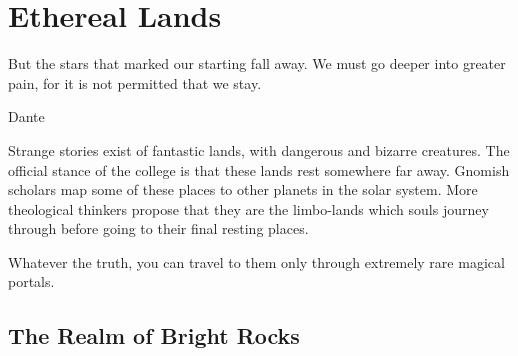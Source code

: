 \chapter{Ethereal Lands}

\epigraph{But the stars that marked our starting fall away.
We must go deeper into greater pain,
for it is not permitted that we stay.}{Dante}

Strange stories exist of fantastic lands, with dangerous and bizarre creatures.  The official stance of the \gls{college} is that these lands rest somewhere far away.
Gnomish scholars map some of these places to other planets in the solar system.
More theological thinkers propose that they are the limbo-lands which souls journey through before going to their final resting places.

Whatever the truth, you can travel to them only through extremely rare magical portals.

\section{The Realm of Bright Rocks}

